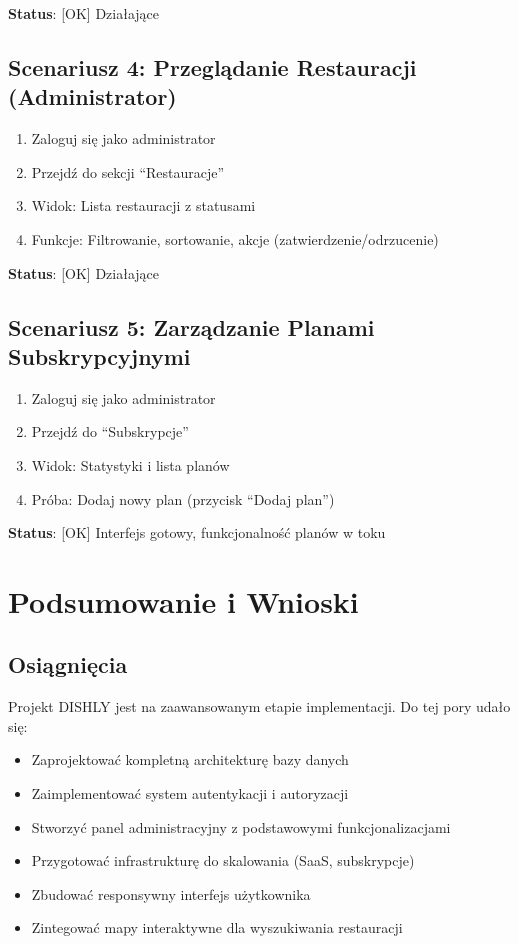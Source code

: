 \documentclass[12pt,a4paper,utf-8]{article}
\begin{document}
\textbf{Status}: [OK] Działające

\subsection{Scenariusz 4: Przeglądanie Restauracji (Administrator)}

\begin{enumerate}
    \item Zaloguj się jako administrator
    \item Przejdź do sekcji ``Restauracje''
    \item Widok: Lista restauracji z statusami
    \item Funkcje: Filtrowanie, sortowanie, akcje (zatwierdzenie/odrzucenie)
\end{enumerate}

\textbf{Status}: [OK] Działające

\subsection{Scenariusz 5: Zarządzanie Planami Subskrypcyjnymi}

\begin{enumerate}
    \item Zaloguj się jako administrator
    \item Przejdź do ``Subskrypcje''
    \item Widok: Statystyki i lista planów
    \item Próba: Dodaj nowy plan (przycisk ``Dodaj plan'')
\end{enumerate}

\textbf{Status}: [OK] Interfejs gotowy, funkcjonalność planów w toku

\newpage

\section{Podsumowanie i Wnioski}

\subsection{Osiągnięcia}

Projekt DISHLY jest na zaawansowanym etapie implementacji. Do tej pory udało się:

\begin{itemize}
    \item Zaprojektować kompletną architekturę bazy danych
    \item Zaimplementować system autentykacji i autoryzacji
    \item Stworzyć panel administracyjny z podstawowymi funkcjonalizacjami
    \item Przygotować infrastrukturę do skalowania (SaaS, subskrypcje)
    \item Zbudować responsywny interfejs użytkownika
    \item Zintegować mapy interaktywne dla wyszukiwania restauracji
\end{itemize}
\end{document}
